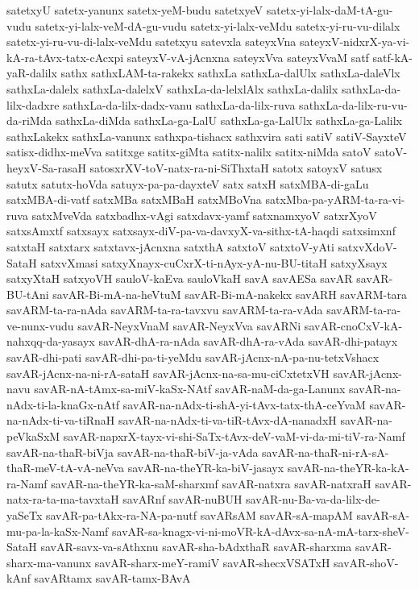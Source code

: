 {satetxyU
satetx-yanunx
satetx-yeM-budu
satetxyeV
satetx-yi-lalx-daM-tA-gu-vudu
satetx-yi-lalx-veM-dA-gu-vudu
satetx-yi-lalx-veMdu
satetx-yi-ru-vu-dilalx
satetx-yi-ru-vu-di-lalx-veMdu
satetxyu
satevxla
sateyxVna
sateyxV-nidxrX-ya-vi-kA-ra-tAvx-tatx-cAcxpi
sateyxV-vA-jAcnxna
sateyxVva
sateyxVvaM
satf
satf-kA-yaR-dalilx
sathx
sathxLAM-ta-rakekx
sathxLa
sathxLa-dalUlx
sathxLa-daleVlx
sathxLa-dalelx
sathxLa-dalelxV
sathxLa-da-lelxlAlx
sathxLa-dalilx
sathxLa-da-lilx-dadxre
sathxLa-da-lilx-dadx-vanu
sathxLa-da-lilx-ruva
sathxLa-da-lilx-ru-vu-da-riMda
sathxLa-diMda
sathxLa-ga-LalU
sathxLa-ga-LalUlx
sathxLa-ga-Lalilx
sathxLakekx
sathxLa-vanunx
sathxpa-tishacx
sathxvira
sati
satiV
satiV-SayxteV
satisx-didhx-meVva
satitxge
satitx-giMta
satitx-nalilx
satitx-niMda
satoV
satoV-heyxV-Sa-rasaH
satosxrXV-toV-natx-ra-ni-SiThxtaH
satotx
satoyxV
satusx
satutx
satutx-hoVda
satuyx-pa-pa-dayxteV
satx
satxH
satxMBA-di-gaLu
satxMBA-di-vatf
satxMBa
satxMBaH
satxMBoVna
satxMba-pa-yARM-ta-ra-vi-ruva
satxMveVda
satxbadhx-vAgi
satxdavx-yamf
satxnamxyoV
satxrXyoV
satxsAmxtf
satxsayx
satxsayx-diV-pa-va-davxyX-va-sithx-tA-haqdi
satxsimxnf
satxtaH
satxtarx
satxtavx-jAcnxna
satxthA
satxtoV
satxtoV-yAti
satxvXdoV-SataH
satxvXmasi
satxyXnayx-cuCxrX-ti-nAyx-yA-nu-BU-titaH
satxyXsayx
satxyXtaH
satxyoVH
sauloV-kaEva
sauloVkaH
savA
savAESa
savAR
savAR-BU-tAni
savAR-Bi-mA-na-heVtuM
savAR-Bi-mA-nakekx
savARH
savARM-tara
savARM-ta-ra-nAda
savARM-ta-ra-tavxvu
savARM-ta-ra-vAda
savARM-ta-ra-ve-nunx-vudu
savAR-NeyxVnaM
savAR-NeyxVva
savARNi
savAR-cnoCxV-kA-nahxqq-da-yasayx
savAR-dhA-ra-nAda
savAR-dhA-ra-vAda
savAR-dhi-patayx
savAR-dhi-pati
savAR-dhi-pa-ti-yeMdu
savAR-jAcnx-nA-pa-nu-tetxVshacx
savAR-jAcnx-na-ni-rA-sataH
savAR-jAcnx-na-sa-mu-ciCxtetxVH
savAR-jAcnx-navu
savAR-nA-tAmx-sa-miV-kaSx-NAtf
savAR-naM-da-ga-Lanunx
savAR-na-nAdx-ti-la-knaGx-nAtf
savAR-na-nAdx-ti-shA-yi-tAvx-tatx-thA-ceYvaM
savAR-na-nAdx-ti-va-tiRnaH
savAR-na-nAdx-ti-va-tiR-tAvx-dA-nanadxH
savAR-na-peVkaSxM
savAR-napxrX-tayx-vi-shi-SaTx-tAvx-deV-vaM-vi-da-mi-tiV-ra-Namf
savAR-na-thaR-biVja
savAR-na-thaR-biV-ja-vAda
savAR-na-thaR-ni-rA-sA-thaR-meV-tA-vA-neVva
savAR-na-theYR-ka-biV-jasayx
savAR-na-theYR-ka-kA-ra-Namf
savAR-na-theYR-ka-saM-sharxmf
savAR-natxra
savAR-natxraH
savAR-natx-ra-ta-ma-tavxtaH
savARnf
savAR-nuBUH
savAR-nu-Ba-va-da-lilx-de-yaSeTx
savAR-pa-tAkx-ra-NA-pa-nutf
savARsAM
savAR-sA-mapAM
savAR-sA-mu-pa-la-kaSx-Namf
savAR-sa-knagx-vi-ni-moVR-kA-dAvx-sa-nA-mA-tarx-sheV-SataH
savAR-savx-va-sAthxnu
savAR-sha-bAdxthaR
savAR-sharxma
savAR-sharx-ma-vanunx
savAR-sharx-meY-ramiV
savAR-shecxVSATxH
savAR-shoV-kAnf
savARtamx
savAR-tamx-BAvA
}
